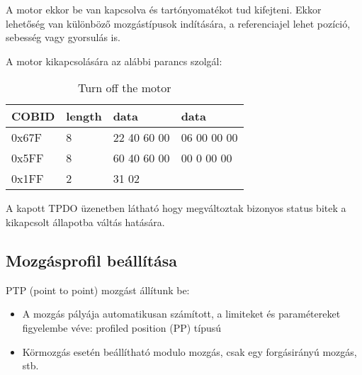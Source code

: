A motor ekkor be van kapcsolva és tartónyomatékot tud kifejteni. Ekkor lehetőség van különböző mozgástípusok indítására, a referenciajel lehet pozíció, sebesség vagy gyorsulás is.

A motor kikapcsolására az alábbi parancs szolgál:

\begin{table}[H]
	\centering
	
	\renewcommand{\arraystretch}{2} %
	
	\begin{tabu}{|p{1.3cm}|p{1cm}|p{2cm}|p{2cm}|}
		\hline
		COBID & length & data & data
		\\ 		\hline
		0x67F & 8 & 22 40 60 00 & 06 00 00 00		
		\\		\hline
		0x5FF & 8 & 60 40 60 00 & 00 0 00 00
		\\		\hline
		0x1FF & 2 & 31 02 &
		\\		\hline
	\end{tabu}
	\caption*{Turn off the motor}
\end{table}

\begin{formal}
	A kapott TPDO üzenetben látható hogy megváltoztak bizonyos status bitek a kikapcsolt állapotba váltás hatására.
\end{formal}

\subsection{Mozgásprofil beállítása}\label{ptp-motion-point-to-point}

PTP (point to point) mozgást állítunk be:

\begin{itemize}
\itemsep1pt\parskip0pt
\item
  A mozgás pályája automatikusan számított, a limiteket és paramétereket figyelembe véve: profiled position (PP) típusú
\item
  Körmozgás esetén beállítható modulo mozgás, csak egy forgásirányú mozgás, stb.
\end{itemize}

%

